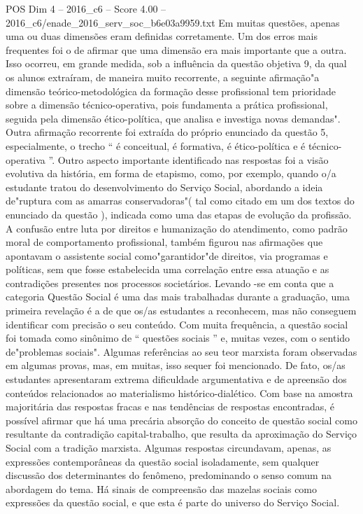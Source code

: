 \begin{textsample}{POS Dim 4 – 2016\_c6 – Score 4.00 – 2016\_c6/enade\_2016\_serv\_soc\_b6e03a9959.txt}
Em muitas questões, apenas uma ou duas dimensões eram definidas corretamente.
Um dos erros mais frequentes foi o de afirmar que uma dimensão era mais importante que a outra.
Isso ocorreu, em grande medida, sob a influência da questão objetiva 9, da qual os alunos extraíram, de maneira muito recorrente, a seguinte afirmação"a dimensão teórico-metodológica da formação desse profissional tem prioridade sobre a dimensão técnico-operativa, pois fundamenta a prática profissional, seguida pela dimensão ético-política, que analisa e investiga novas demandas".
Outra afirmação recorrente foi extraída do próprio enunciado da questão 5, especialmente, o trecho “ é conceitual, é formativa, é ético-política e é técnico-operativa ”.
Outro aspecto importante identificado nas respostas foi a visão evolutiva da história, em forma de etapismo, como, por exemplo, quando o/a estudante tratou do desenvolvimento do Serviço Social, abordando a ideia de"ruptura com as amarras conservadoras"( tal como citado em um dos textos do enunciado da questão ), indicada como uma das etapas de evolução da profissão.
A confusão entre luta por direitos e humanização do atendimento, como padrão moral de comportamento profissional, também figurou nas afirmações que apontavam o assistente social como"garantidor"de direitos, via programas e políticas, sem que fosse estabelecida uma correlação entre essa atuação e as contradições presentes nos processos societários.
Levando -se em conta que a categoria Questão Social é uma das mais trabalhadas durante a graduação, uma primeira revelação é a de que os/as estudantes a reconhecem, mas não conseguem identificar com precisão o seu conteúdo.
Com muita frequência, a questão social foi tomada como sinônimo de “ questões sociais ” e, muitas vezes, com o sentido de"problemas sociais".
Algumas referências ao seu teor marxista foram observadas em algumas provas, mas, em muitas, isso sequer foi mencionado.
De fato, os/as estudantes apresentaram extrema dificuldade argumentativa e de apreensão dos conteúdos relacionados ao materialismo histórico-dialético.
Com base na amostra majoritária das respostas fracas e nas tendências de respostas encontradas, é possível afirmar que há uma precária absorção do conceito de questão social como resultante da contradição capital-trabalho, que resulta da aproximação do Serviço Social com a tradição marxista.
Algumas respostas circundavam, apenas, as expressões contemporâneas da questão social isoladamente, sem qualquer discussão dos determinantes do fenômeno, predominando o senso comum na abordagem do tema.
Há sinais de compreensão das mazelas sociais como expressões da questão social, e que esta é parte do universo do Serviço Social.

\end{textsample}

